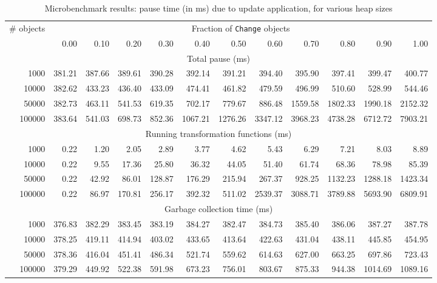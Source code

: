 \begin{table}[t]
\begin{footnotesize}
\begin{center}
\begin{tabular}{|r|rrrrrrrrrrr|} \hline
\# objects & \multicolumn{11}{c|}{Fraction of \texttt{Change} objects} \\
          &   0.00 &  0.10&   0.20&   0.30&   0.40&   0.50&   0.60&   0.70& 0.80&   0.90&   1.00 \\ \hline

    \multicolumn{12}{|c|}{Total pause (ms)} \\ \hline
      1000& 381.21 &387.66& 389.61& 390.28& 392.14& 391.21& 394.40& 395.90& 397.41& 399.47& 400.77 \\
     10000& 382.62 &433.23& 436.40& 433.09& 474.41& 461.82& 479.59& 496.99& 510.60& 528.99& 544.46 \\
     50000& 382.73 &463.11& 541.53& 619.35& 702.17& 779.67& 886.48&1559.58&1802.33&1990.18&2152.32 \\
    100000& 383.64 &541.03& 698.73& 852.36&1067.21&1276.26&3347.12&3968.23&4738.28&6712.72&7903.21 \\ \hline

    \multicolumn{12}{|c|}{Running transformation functions (ms)} \\ \hline
      1000&   0.22 &  1.20&   2.05&   2.89&   3.77&   4.62&   5.43&   6.29&   7.21&   8.03&   8.89 \\
     10000&   0.22 &  9.55&  17.36&  25.80&  36.32&  44.05&  51.40&  61.74&  68.36&  78.98&  85.39 \\
     50000&   0.22 & 42.92&  86.01& 128.87& 176.29& 215.94& 267.37& 928.25&1132.23&1288.18&1423.34 \\
    100000&   0.22 & 86.97& 170.81& 256.17& 392.32& 511.02&2539.37&3088.71&3789.88&5693.90&6809.91 \\ \hline

    \multicolumn{12}{|c|}{Garbage collection time (ms)} \\ \hline
      1000& 376.83 &382.29& 383.45& 383.19& 384.27& 382.47& 384.73& 385.40& 386.06& 387.27& 387.78 \\
     10000& 378.25 &419.11& 414.94& 403.02& 433.65& 413.64& 422.63& 431.04& 438.11& 445.85& 454.95 \\
     50000& 378.36 &416.04& 451.41& 486.34& 521.74& 559.62& 614.63& 627.00& 663.25& 697.86& 723.43 \\
    100000& 379.29 &449.92& 522.38& 591.98& 673.23& 756.01& 803.67& 875.33& 944.38&1014.69&1089.16 \\ \hline
\end{tabular}
\end{center}
\end{footnotesize}
\caption{Microbenchmark results: \DSU{} pause time (in ms) due to update application, for various heap sizes}
\label{tab:microbench}
\end{table}




